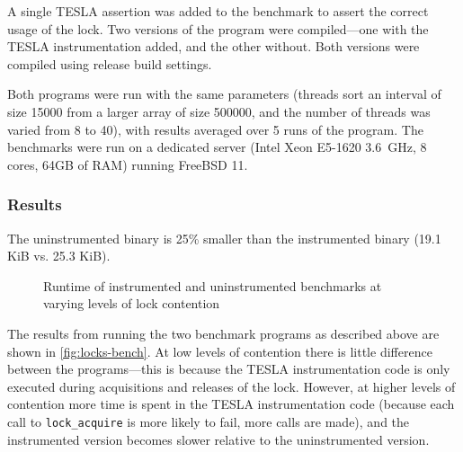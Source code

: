 A single TESLA assertion was added to the benchmark to assert the correct usage
of the lock. Two versions of the program were compiled---one with the TESLA
instrumentation added, and the other without. Both versions were compiled using
release build settings.

Both programs were run with the same parameters (threads sort an interval of
size \num{15000} from a larger array of size \num{500000}, and the number of
threads was varied from 8 to 40), with results averaged over 5 runs of the
program. The benchmarks were run on a dedicated server (Intel Xeon E5-1620
\SI{3.6}{\GHz}, 8 cores, 64GB of RAM) running FreeBSD 11.

\subsubsection{Results}

The uninstrumented binary is 25\% smaller than the instrumented binary
(\num{19.1} KiB vs. \num{25.3} KiB).

\begin{figure}
  \centering
  \caption{Runtime of instrumented and uninstrumented benchmarks at
  varying levels of lock contention}
  \label{fig:locks-bench}
\end{figure}

The results from running the two benchmark programs as described above are shown
in \autoref{fig:locks-bench}. At low levels of contention there is little
difference between the programs---this is because the TESLA instrumentation code
is only executed during acquisitions and releases of the lock. However, at
higher levels of contention more time is spent in the TESLA instrumentation code
(because each call to \texttt{lock_acquire} is more likely to fail, more
calls are made), and the instrumented version becomes slower relative to the
uninstrumented version.

